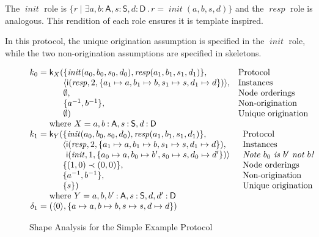 \documentclass[titlepage,12pt]{article}
\newcommand{\fn}[1]{\ensuremath{\operatorname{\mathit{#1}}}}
\newcommand{\srt}[1]{\ensuremath{\mathsf{#1}}}
\newcommand{\typ}{\mathbin:}
\newcommand{\seq}[1]{\ensuremath{\langle#1\rangle}}
\newcommand{\invk}[1]{{#1}^{-1}}
\newcommand{\some}[1]{\exists#1\mathpunct.}
\newcommand{\init}{\fn{init}}
\newcommand{\resp}{\fn{resp}}
\newcommand{\skel}{\mathsf{k}}
\newcommand{\insta}{\mathsf{i}}
\begin{document}
The {\init} role is
$\{r\mid\some{a,b\typ\srt{A},s\typ\srt{S},d\typ\srt{D}}
r=\init(a,b,s,d)\}$ and the {\resp} role is analogous.  This rendition
of each role ensures it is template inspired.

In this protocol, the unique origination assumption is specified in
the {\init} role, while the two non-origination assumptions are
specified in skeletons.

\begin{figure}
$$\begin{array}{@{}r@{}c@{}l@{}}
k_0&{}={}&\skel_X(\begin{array}[t]{@{}ll}
\{\init(a_0,b_0,s_0,d_0),\resp(a_1,b_1,s_1,d_1)\},
&\mbox{Protocol}\\
\seq{\insta(\resp,2,\{a_1\mapsto a,b_1\mapsto b,s_1\mapsto s,d_1\mapsto d\})},
&\mbox{Instances}\\
\emptyset,
&\mbox{Node orderings}\\
\{\invk{a},\invk{b}\},
&\mbox{Non-origination}\\
\emptyset)
&\mbox{Unique origination}
\end{array}\\
&&\mbox{where $X=a,b\typ\srt{A},s\typ\srt{S}, d\typ\srt{D}$}\\
k_1&{}={}&\skel_Y(\begin{array}[t]{@{}ll}
\{\init(a_0,b_0,s_0,d_0),\resp(a_1,b_1,s_1,d_1)\},
&\mbox{Protocol}\\
\langle\begin{array}[t]{@{}l}
\insta(\resp,2,\{a_1\mapsto a,b_1\mapsto b,s_1\mapsto s,d_1\mapsto d\}),\\
\insta(\init,1,\{a_0\mapsto a,b_0\mapsto b',s_0\mapsto s,d_0\mapsto d'\})\rangle
\end{array}
&\begin{array}[t]{@{}l}
\mbox{Instances}\\
\mbox{\emph{Note $b_0$ is $b'$ not $b$!}}
\end{array}\\
\{(1,0)\prec(0,0)\},
&\mbox{Node orderings}\\
\{\invk{a},\invk{b}\},
&\mbox{Non-origination}\\
\{s\})
&\mbox{Unique origination}
\end{array}\\
&&\mbox{where $Y=a,b,b'\typ\srt{A},s\typ\srt{S}, d,d'\typ\srt{D}$}\\
\delta_1&{}={}&(\seq{0},\{a\mapsto a, b\mapsto b, s\mapsto s, d\mapsto d\})
\end{array}$$
\caption{Shape Analysis for the Simple Example Protocol}\label{fig:blanchet's shape analysis}
\end{figure}
\end{document}
